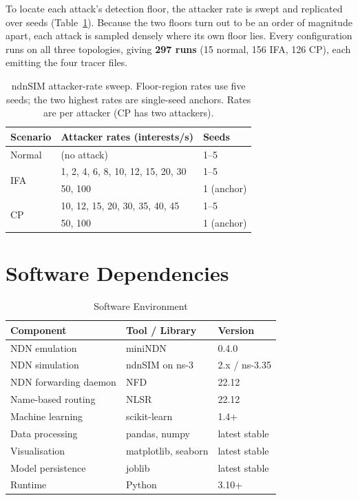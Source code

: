 \documentclass[12pt]{report}
\begin{document}
To locate each attack's detection floor, the attacker rate is swept and replicated over seeds (Table~\ref{tab:sweep-matrix}). Because the two floors turn out to be an order of magnitude apart, each attack is sampled densely where its own floor lies. Every configuration runs on all three topologies, giving \textbf{297 runs} (15 normal, 156 IFA, 126 CP), each emitting the four tracer files.

\begin{table}[H]
\centering
\caption{ndnSIM attacker-rate sweep. Floor-region rates use five seeds; the two highest rates are single-seed anchors. Rates are per attacker (CP has two attackers).}
\label{tab:sweep-matrix}
\begin{tabular}{lll}
\toprule
\textbf{Scenario} & \textbf{Attacker rates (interests/s)} & \textbf{Seeds} \\
\midrule
Normal & (no attack) & 1--5 \\
\midrule
\multirow{2}{*}{IFA}
  & 1, 2, 4, 6, 8, 10, 12, 15, 20, 30 & 1--5 \\
  & 50, 100 & 1 (anchor) \\
\midrule
\multirow{2}{*}{CP}
  & 10, 12, 15, 20, 30, 35, 40, 45 & 1--5 \\
  & 50, 100 & 1 (anchor) \\
\bottomrule
\end{tabular}
\end{table}

\section{Software Dependencies}

\begin{table}[H]
\centering
\caption{Software Environment}
\label{tab:software}
\begin{tabular}{@{}lll@{}}
\toprule
\textbf{Component}        & \textbf{Tool / Library}   & \textbf{Version}  \\
\midrule
NDN emulation             & miniNDN                   & 0.4.0             \\
NDN simulation            & ndnSIM on ns-3            & 2.x / ns-3.35     \\
NDN forwarding daemon     & NFD                       & 22.12             \\
Name-based routing        & NLSR                      & 22.12             \\
Machine learning          & scikit-learn              & 1.4+              \\
Data processing           & pandas, numpy             & latest stable     \\
Visualisation             & matplotlib, seaborn       & latest stable     \\
Model persistence         & joblib                    & latest stable     \\
Runtime                   & Python                    & 3.10+             \\
\bottomrule
\end{tabular}
\end{table}
\end{document}

